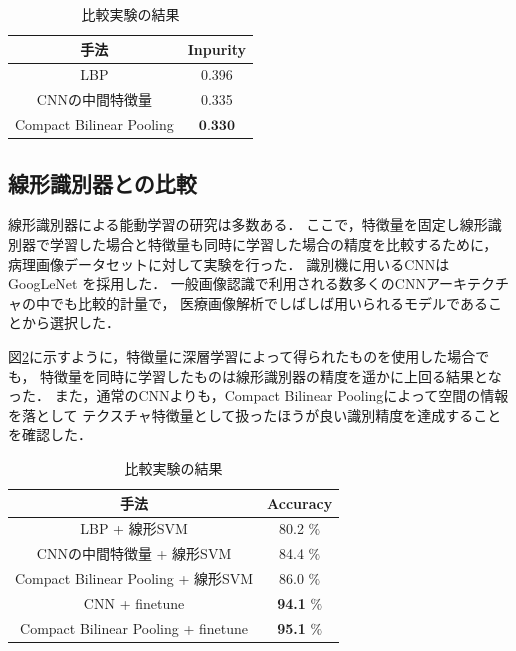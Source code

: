 \begin{table}[h]
  \caption{\label{table:compare_feat}比較実験の結果}
  \center
  \begin{tabular}{c|c} \hline
     手法 & Inpurity \\ \hline
    LBP & 0.396 \\
    CNNの中間特徴量 & 0.335  \\ 
    Compact Bilinear Pooling & $\textbf{0.330}$ \\ \hline
  \end{tabular}
\end{table}

\subsection{線形識別器との比較}
線形識別器による能動学習の研究は多数ある．
ここで，特徴量を固定し線形識別器で学習した場合と特徴量も同時に学習した場合の精度を比較するために，
病理画像データセットに対して実験を行った．
識別機に用いるCNNはGoogLeNet \cite{szegedy2015going}を採用した．
一般画像認識で利用される数多くのCNNアーキテクチャの中でも比較的計量で，
医療画像解析でしばしば用いられるモデルであることから選択した．

図\ref{table:compare_classifier}に示すように，特徴量に深層学習によって得られたものを使用した場合でも，
特徴量を同時に学習したものは線形識別器の精度を遥かに上回る結果となった．
また，通常のCNNよりも，Compact Bilinear Poolingによって空間の情報を落として
テクスチャ特徴量として扱ったほうが良い識別精度を達成することを確認した．

\begin{table}[h]
  \caption{\label{table:compare_classifier}比較実験の結果}
  \center
  \begin{tabular}{c|c} \hline
    手法 & Accuracy  \\ \hline
    LBP + 線形SVM & 80.2 $\%$ \\
    CNNの中間特徴量 + 線形SVM & 84.4 $\%$  \\ 
    Compact Bilinear Pooling + 線形SVM & 86.0 $\%$ \\ \hline
    CNN + finetune & \textbf{94.1} $\%$  \\ 
    Compact Bilinear Pooling + finetune & \textbf{95.1} $\%$ \\ \hline
  \end{tabular}
\end{table}


